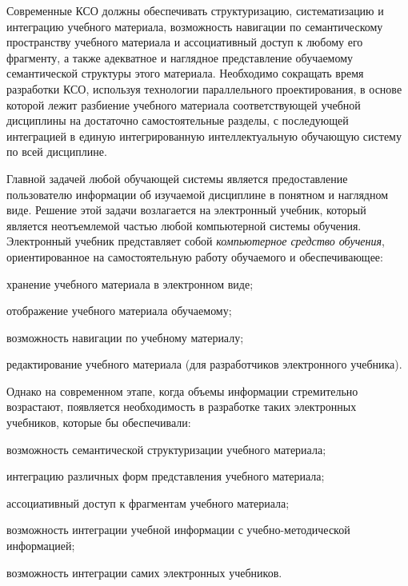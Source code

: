 Современные КСО должны обеспечивать структуризацию, систематизацию и интеграцию учебного материала, возможность навигации по семантическому пространству учебного материала и ассоциативный доступ к любому его фрагменту, а также адекватное и наглядное представление обучаемому семантической структуры этого материала. Необходимо сокращать время разработки КСО, используя технологии параллельного проектирования, в основе которой лежит разбиение учебного материала соответствующей учебной дисциплины на достаточно самостоятельные разделы, с последующей интеграцией в единую интегрированную интеллектуальную обучающую систему по всей дисциплине.

Главной задачей любой обучающей системы является предоставление пользователю информации об изучаемой дисциплине в понятном и наглядном виде. Решение этой задачи возлагается на электронный учебник, который является неотъемлемой частью любой компьютерной системы обучения. Электронный учебник представляет собой \textit{компьютерное средство обучения}, ориентированное на самостоятельную работу обучаемого и обеспечивающее:

\begin{textitemize}
	\item хранение учебного материала в электронном виде;
	\item отображение учебного материала обучаемому;
	\item возможность навигации по учебному материалу;
	\item редактирование учебного материала (для разработчиков электронного учебника).
\end{textitemize}

Однако на современном этапе, когда объемы информации стремительно возрастают, появляется необходимость в разработке таких электронных учебников, которые бы обеспечивали:

\begin{textitemize}
	\item возможность семантической структуризации учебного материала;
	\item интеграцию различных форм представления учебного материала;
	\item ассоциативный доступ к фрагментам учебного материала;
	\item возможность интеграции учебной информации с учебно-методической информацией;
	\item возможность интеграции самих электронных учебников.
\end{textitemize}

